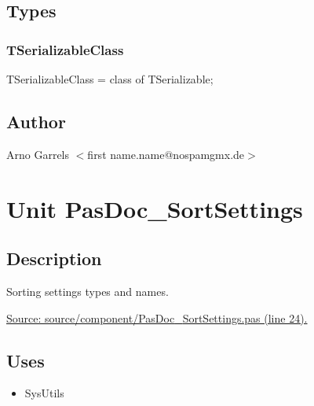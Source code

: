 \documentclass{report}
\newif\ifpdf
\begin{document}
\section{Types}
\ifpdf
\subsection*{\large{\textbf{TSerializableClass}}\normalsize\hspace{1ex}\hrulefill}
\else
\subsection*{TSerializableClass}
\fi
\label{PasDoc_Serialize-TSerializableClass}
\begin{list}{}{
\setlength{\itemindent}{0cm}
\setlength{\listparindent}{0cm}
\setlength{\leftmargin}{\evensidemargin}
\addtolength{\leftmargin}{\tmplength}
\settowidth{\labelsep}{X}
\addtolength{\leftmargin}{\labelsep}
\setlength{\labelwidth}{\tmplength}
}
\item[\textbf{Declaration}\hfill]
\ifpdf
\begin{flushleft}
\fi
\begin{ttfamily}
TSerializableClass = class of TSerializable;\end{ttfamily}

\ifpdf
\end{flushleft}
\fi

\end{list}
\section{Author}
\par
Arno Garrels {$<$}first name.name@nospamgmx.de{$>$}

\chapter{Unit PasDoc{\_}SortSettings}
\label{PasDoc_SortSettings}
\section{Description}
Sorting settings types and names.\par
\href{https://github.com/pasdoc/pasdoc/blob/master/source/component/PasDoc_SortSettings.pas#L24}{Source: source/component/PasDoc{\_}SortSettings.pas (line 24).}
\section{Uses}
\begin{itemize}
\item \begin{ttfamily}SysUtils\end{ttfamily}\end{itemize}
\end{document}
